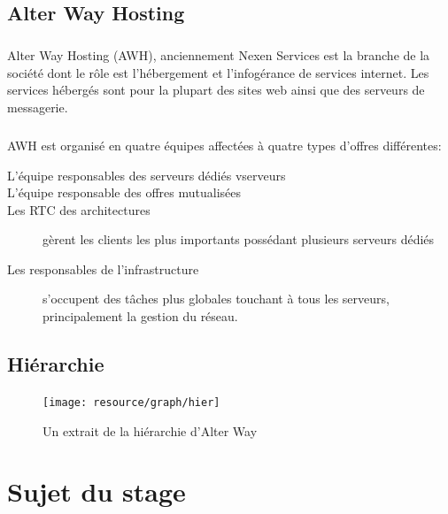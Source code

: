 \section{Alter Way Hosting}
\paragraph*{}
Alter Way Hosting (AWH), anciennement Nexen Services est la branche de la société dont le rôle est l'hébergement et l'infogérance de services internet.
Les services hébergés sont pour la plupart des sites web ainsi que des serveurs de messagerie.

\paragraph*{}
AWH est organisé en quatre équipes affectées à quatre types d'offres différentes:

\begin{description}
	\item[L'équipe responsables des serveurs dédiés vserveurs \footnotemark]
	\item[L'équipe responsable des offres mutualisées
		\footnotemark] 
	\item[Les RTC \footnotemark des architectures] 
		gèrent les clients les plus importants possédant plusieurs serveurs dédiés
	\item[Les responsables de l'infrastructure] s'occupent des tâches plus globales touchant à tous les serveurs,
		principalement la gestion du réseau.

\end{description}


\section{Hiérarchie}

\begin{figure}[H]
	\centering
	\texttt{[image: resource/graph/hier]}
	\caption{Un extrait de la hiérarchie d'Alter Way}
\end{figure}

\chapter{Sujet du stage}


